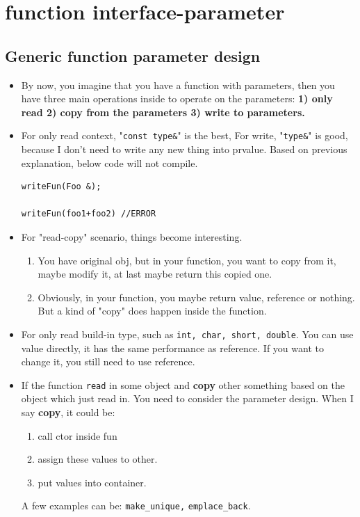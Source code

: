 \documentclass[a4paper,11pt,twoside]{book}
\begin{document}
\section{function interface-parameter}

\subsection{Generic function parameter design}

\begin{itemize}

\item  By now, you imagine that you have a function with parameters, then you have three main operations inside to operate on the parameters: \textbf{1) only read 2) copy from the parameters 3) write to parameters.}

\item For only read context, "\texttt{const type\&}" is the best, For write, "\texttt{type\&}" is good, because I don't need to write any new thing into prvalue. Based on previous explanation, below code will not compile. 
\begin{lstlisting}[numbers=none]
writeFun(Foo &);

writeFun(foo1+foo2) //ERROR
\end{lstlisting}

\item For "read-copy" scenario, things become interesting.
\begin{enumerate}
	\item You have original obj, but in your function, you want to copy from it, maybe modify it, at last maybe return this copied one.

	\item Obviously, in your function, you maybe return value, reference or nothing. But a kind of "copy" does happen inside the function.
\end{enumerate}

\item For only read build-in type, such as \texttt{int, char, short, double}. You can use value directly, it has the same performance as reference. If you want to change it, you still need to use reference.

\item If the function \texttt{read} in some object and \textbf{copy} other something based on the object which just read in. You need to consider the parameter design. When I say \textbf{copy}, it could be:
\begin{enumerate}
	\item call ctor inside fun
	\item assign these values to other.
	\item put values into container.
\end{enumerate} 
A few examples can be: \texttt{make\_unique,} \texttt{emplace\_back}.
\end{itemize}
\end{document}

